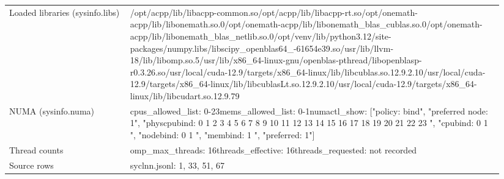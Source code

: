 \begin{longtable}{>{\raggedright\arraybackslash}p{0.23\linewidth}>{\raggedright\arraybackslash}p{0.71\linewidth}}
Loaded libraries (sysinfo.libs) & /\allowbreak{}opt/\allowbreak{}acpp/\allowbreak{}lib/\allowbreak{}libacpp-common.so\newline /\allowbreak{}opt/\allowbreak{}acpp/\allowbreak{}lib/\allowbreak{}libacpp-rt.so\newline /\allowbreak{}opt/\allowbreak{}onemath-acpp/\allowbreak{}lib/\allowbreak{}libonemath.so.0\newline /\allowbreak{}opt/\allowbreak{}onemath-acpp/\allowbreak{}lib/\allowbreak{}libonemath\_\allowbreak{}blas\_\allowbreak{}cublas.so.0\newline /\allowbreak{}opt/\allowbreak{}onemath-acpp/\allowbreak{}lib/\allowbreak{}libonemath\_\allowbreak{}blas\_\allowbreak{}netlib.so.0\newline /\allowbreak{}opt/\allowbreak{}venv/\allowbreak{}lib/\allowbreak{}python3.12/\allowbreak{}site-packages/\allowbreak{}numpy.libs/\allowbreak{}libscipy\_\allowbreak{}openblas64\_\allowbreak{}-61654e39.so\newline /\allowbreak{}usr/\allowbreak{}lib/\allowbreak{}llvm-18/\allowbreak{}lib/\allowbreak{}libomp.so.5\newline /\allowbreak{}usr/\allowbreak{}lib/\allowbreak{}x86\_\allowbreak{}64-linux-gnu/\allowbreak{}openblas-pthread/\allowbreak{}libopenblasp-r0.3.26.so\newline /\allowbreak{}usr/\allowbreak{}local/\allowbreak{}cuda-12.9/\allowbreak{}targets/\allowbreak{}x86\_\allowbreak{}64-linux/\allowbreak{}lib/\allowbreak{}libcublas.so.12.9.2.10\newline /\allowbreak{}usr/\allowbreak{}local/\allowbreak{}cuda-12.9/\allowbreak{}targets/\allowbreak{}x86\_\allowbreak{}64-linux/\allowbreak{}lib/\allowbreak{}libcublasLt.so.12.9.2.10\newline /\allowbreak{}usr/\allowbreak{}local/\allowbreak{}cuda-12.9/\allowbreak{}targets/\allowbreak{}x86\_\allowbreak{}64-linux/\allowbreak{}lib/\allowbreak{}libcudart.so.12.9.79 \\
NUMA (sysinfo.numa) & cpus\_\allowbreak{}allowed\_\allowbreak{}list: 0-23\newline mems\_\allowbreak{}allowed\_\allowbreak{}list: 0-1\newline numactl\_\allowbreak{}show: ["policy: bind", "preferred node: 1", "physcpubind: 0 1 2 3 4 5 6 7 8 9 10 11 12 13 14 15 16 17 18 19 20 21 22 23 ", "cpubind: 0 1 ", "nodebind: 0 1 ", "membind: 1 ", "preferred: 1"] \\
Thread counts & omp\_\allowbreak{}max\_\allowbreak{}threads: 16\newline threads\_\allowbreak{}effective: 16\newline threads\_\allowbreak{}requested: not recorded \\
Source rows & syclnn.jsonl: 1, 33, 51, 67 \\
\end{longtable}
